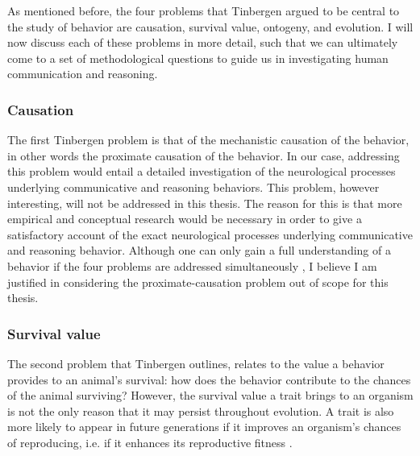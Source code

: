 As mentioned before, the four problems that Tinbergen argued to be central to the study of behavior are causation, survival value, ontogeny, and evolution. I will now discuss each of these problems in more detail, such that we can ultimately come to a set of methodological questions to guide us in investigating human communication and reasoning.


\subsubsection{Causation}
The first Tinbergen problem is that of the mechanistic causation of the behavior, in other words the proximate causation of the behavior. In our case, addressing this problem would entail a detailed investigation of the neurological processes underlying communicative and reasoning behaviors.
This problem, however interesting, will not be addressed in this thesis. The reason for this is that more empirical and conceptual research would be necessary in order to give a satisfactory account of the exact neurological processes underlying communicative and reasoning behavior. Although one can only gain a full understanding of a behavior if the four problems are addressed simultaneously \citep{Tinbergen63, BatesonLaland13}, I believe I am justified in considering the proximate-causation problem out of scope for this thesis.

\subsubsection{Survival value}
The second problem that Tinbergen outlines, relates to the value a behavior provides to an animal's survival: how does the behavior contribute to the chances of the animal surviving? However, the survival value a trait brings to an organism is not the only reason that it may persist throughout evolution. A trait is also more likely to appear in future generations if it improves an organism's chances of reproducing, i.e. if it enhances its reproductive fitness
\citep{BatesonLaland13} .

